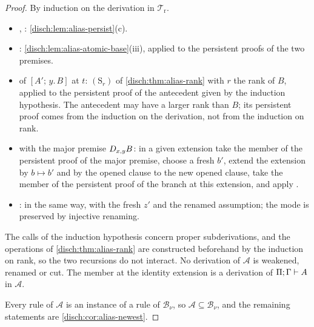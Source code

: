 \begin{proof}
By induction on the derivation in $\mathcal T_{\mathrm r}$.
\begin{itemize}
\item {}, : \cref{disch:lem:alias-persist}(c).
\item {}: \cref{disch:lem:alias-atomic-base}(iii), applied to
 the persistent proofs of the two premises.
\item {} of $[A';\,y.\,B]$ at $t$: $(\mathrm S_r)$ of
 \cref{disch:thm:alias-rank} with $r$ the rank of $B$, applied to the
 persistent proof of the antecedent given by the induction hypothesis.
 The antecedent may have a larger rank than $B$; its persistent proof comes
 from the induction on the derivation, not from the induction on rank.
\item {} with the major premise $D_{x,y}B$: in a given
 extension take the member of the persistent proof of the major premise,
 choose a fresh $b'$, extend the extension by $b\mapsto b'$ and by the
 opened clause to the new opened clause, take the member of the persistent
 proof of the branch at this extension, and apply .
\item {}: in the same way, with the fresh $z'$ and the
 renamed assumption; the mode is preserved by injective renaming.
\end{itemize}
The calls of the induction hypothesis concern proper subderivations, and
the operations of \cref{disch:thm:alias-rank} are constructed beforehand by
the induction on rank, so the two recursions do not interact. No
derivation of $\mathcal A$ is weakened, renamed or cut. The member at the
identity extension is a derivation of $\Pi;\Gamma\vdash A$ in
$\mathcal A$.

Every rule of $\mathcal A$ is an instance of a rule of $\mathcal B_{\nu}$,
so $\mathcal A\subseteq\mathcal B_{\nu}$, and the remaining statements are
\cref{disch:cor:alias-newest}.
\end{proof}

